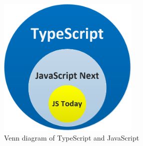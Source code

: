 \begin{figure}[htbp]
      \centering
      \includegraphics[width=0.6\textwidth]{Figures/TSJSVenn.png}
      \caption{Venn diagram of TypeScript and JavaScript}
      \label{fig:tsjsvenn}
\end{figure}

